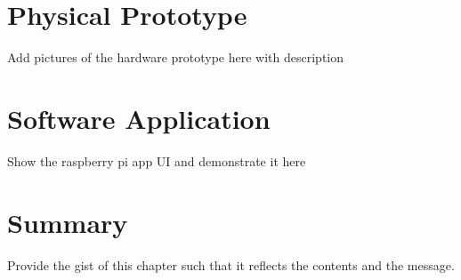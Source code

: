 \section{Physical Prototype} \label{sec:physicalPrototype}

Add pictures of the hardware prototype here with description

\section{Software Application}

Show the raspberry pi app UI and demonstrate it here 

\section{Summary} \label{sec:summary_results_and_discussions}

Provide the gist of this chapter such that it reflects the contents and the message.